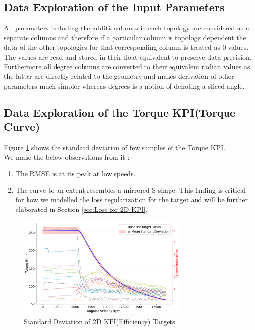 \documentclass{report} %
\begin{document}
\subsection{Data Exploration of the Input Parameters}\label{sec:Deep Dive into Input Parameters}
All parameters including the additional ones in each topology are considered as a separate columns and therefore if a particular column is topology dependent the data of the other topologies for that corresponding column is treated as 0 values.\\
The values are read and stored in their float equivalent to preserve data precision. \\
Furthermore all degree columns are converted to their equivalent radian values as the latter are directly related to the geometry and makes derivation of other parameters much simpler whereas degrees is a notion of denoting a sliced angle.\\

\subsection{Data Exploration of the Torque \ac{KPI}(Torque Curve)}\label{sec:Deep Dive into 2D KPI}

Figure \ref{fig:Standard Deviation of 2D KPI(Efficiency) Targets} shows the standard deviation of few samples of the Torque \ac{KPI}.\\

We make the below  observations from it :
\begin{enumerate}
    \item The \ac{RMSE} is at its peak at low speeds.
    \item The curve to an extent resembles a mirrored S shape.
    This finding is critical for how we modelled the loss regularization for the target and will be further elaborated in Section \ref{sec:Loss for 2D KPI}.
\end{enumerate}

\begin{figure}[H]
    \centering
    \includegraphics[width=0.75\textwidth]{./ReportImages/StandardDeviation_Baseline_y1.png} 
    \caption{Standard Deviation of 2D KPI(Efficiency) Targets} 
    \label{fig:Standard Deviation of 2D KPI(Efficiency) Targets}
\end{figure}
\end{document}
